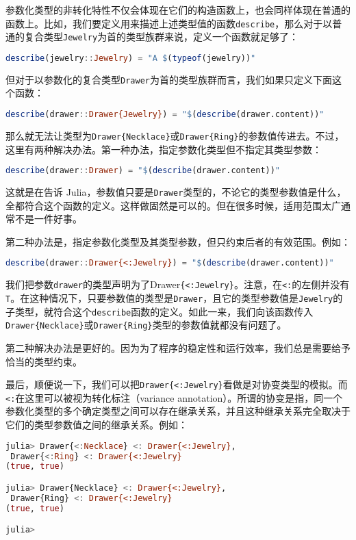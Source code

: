 参数化类型的非转化特性不仅会体现在它们的构造函数上，也会同样体现在普通的函数上。比如，我们要定义用来描述上述类型值的函数\verb`describe`，那么对于以普通的复合类型\verb`Jewelry`为首的类型族群来说，定义一个函数就足够了：
\begin{lstlisting}[language=julia]
describe(jewelry::Jewelry) = "A $(typeof(jewelry))"
\end{lstlisting}

但对于以参数化的复合类型\verb`Drawer`为首的类型族群而言，我们如果只定义下面这个函数：
\begin{lstlisting}[language=julia]
describe(drawer::Drawer{Jewelry}) = "$(describe(drawer.content))"
\end{lstlisting}

那么就无法让类型为\verb`Drawer{Necklace}`或\verb`Drawer{Ring}`的参数值传进去。不过，这里有两种解决办法。第一种办法，指定参数化类型但不指定其类型参数：
\begin{lstlisting}[language=julia]
describe(drawer::Drawer) = "$(describe(drawer.content))"
\end{lstlisting}

这就是在告诉 Julia，参数值只要是\verb`Drawer`类型的，不论它的类型参数值是什么，全都符合这个函数的定义。这样做固然是可以的。但在很多时候，适用范围太广通常不是一件好事。

第二种办法是，指定参数化类型及其类型参数，但只约束后者的有效范围。例如：
\begin{lstlisting}[language=julia]
describe(drawer::Drawer{<:Jewelry}) = "$(describe(drawer.content))"
\end{lstlisting}

我们把参数\verb`drawer`的类型声明为了Drawer\verb`{<:Jewelry}`。注意，在\verb`<:`的左侧并没有\verb`T`。在这种情况下，只要参数值的类型是\verb`Drawer`，且它的类型参数值是\verb`Jewelry`的子类型，就符合这个\verb`describe`函数的定义。如此一来，我们向该函数传入\verb`Drawer{Necklace}`或\verb`Drawer{Ring}`类型的参数值就都没有问题了。

第二种解决办法是更好的。因为为了程序的稳定性和运行效率，我们总是需要给予恰当的类型约束。

最后，顺便说一下，我们可以把\verb`Drawer{<:Jewelry}`看做是对协变类型的模拟。而\verb`<:`在这里可以被视为转化标注（variance annotation）。所谓的协变是指，同一个参数化类型的多个确定类型之间可以存在继承关系，并且这种继承关系完全取决于它们的类型参数值之间的继承关系。例如：
\begin{lstlisting}[language=julia]
julia> Drawer{<:Necklace} <: Drawer{<:Jewelry},
 Drawer{<:Ring} <: Drawer{<:Jewelry}
(true, true)

julia> Drawer{Necklace} <: Drawer{<:Jewelry},
 Drawer{Ring} <: Drawer{<:Jewelry}
(true, true)

julia> 
\end{lstlisting}


